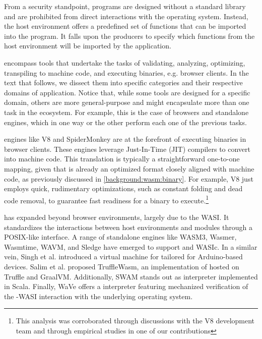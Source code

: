 From a security standpoint, \Wasm programs are designed without a standard library and are prohibited from direct interactions with the operating system. Instead, the host environment offers a predefined set of functions that can be imported into the \Wasm program. 
It falls upon the producers to specify which functions from the host environment will be imported by the \Wasm application.

 encompass tools that undertake the tasks of validating, analyzing, optimizing, transpiling to machine code, and executing \Wasm binaries, e.g. browser clients. 
In the text that follows, we dissect them into specific categories and their respective domains of application.
Notice that, while some tools are designed for a specific domain, others are more general-purpose and might encapsulate more than one task in the \Wasm ecosystem.
For example, this is the case of browsers and standalone engines, which in one way or the other perform each one of the previous tasks.


 engines like V8 and SpiderMonkey are at the forefront of executing \Wasm binaries in browser clients. 
These engines leverage Just-In-Time (JIT) compilers to convert \Wasm into machine code. 
This translation is typically a straightforward one-to-one mapping, given that \Wasm is already an optimized format closely aligned with machine code, as previously discussed in \autoref{background:wasm:binary}. 
For example, V8 just employs quick, rudimentary optimizations, such as constant folding and dead code removal, to guarantee fast readiness for a \wasm binary to execute.\footnote{This analysis was corroborated through discussions with the V8 development team and through empirical studies in one of our contributions\cite{CROW}} 

\Wasm has expanded beyond browser environments, largely due to the WASI\cite{WASI}. 
It standardizes the interactions between host environments and \Wasm modules through a POSIX-like interface.
A range of standalone engines like WASM3, Wasmer, Wasmtime, WAVM, and Sledge\cite{Sledge} have emerged to support \Wasm and WASIc. 
In a similar vein, Singh et al.\cite{WARDuino2019} introduced a virtual machine for \Wasm tailored for Arduino-based devices. 
Salim et al.\cite{trufflewasm} proposed TruffleWasm, an implementation of \Wasm hosted on Truffle and GraalVM. 
Additionally, SWAM stands out as \Wasm interpreter implemented in Scala. 
Finally, WaVe\cite{wave} offers a \Wasm interpreter featuring mechanized verification of the \Wasm-WASI interaction with the underlying operating system.


